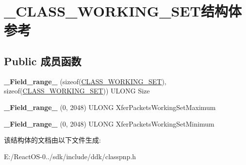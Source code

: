 \hypertarget{struct___c_l_a_s_s___w_o_r_k_i_n_g___s_e_t}{}\section{\+\_\+\+C\+L\+A\+S\+S\+\_\+\+W\+O\+R\+K\+I\+N\+G\+\_\+\+S\+E\+T结构体 参考}
\label{struct___c_l_a_s_s___w_o_r_k_i_n_g___s_e_t}
\subsection*{Public 成员函数}
\begin{DoxyCompactItemize}
\item 
\mbox{\label{struct___c_l_a_s_s___w_o_r_k_i_n_g___s_e_t_a23b84d77333ad68f33f71a8c86b0ad37}} 
{\bfseries \+\_\+\+Field\+\_\+range\+\_\+} (sizeof(\hyperlink{struct___c_l_a_s_s___w_o_r_k_i_n_g___s_e_t}{C\+L\+A\+S\+S\+\_\+\+W\+O\+R\+K\+I\+N\+G\+\_\+\+S\+ET}), sizeof(\hyperlink{struct___c_l_a_s_s___w_o_r_k_i_n_g___s_e_t}{C\+L\+A\+S\+S\+\_\+\+W\+O\+R\+K\+I\+N\+G\+\_\+\+S\+ET})) U\+L\+O\+NG Size
\item 
\mbox{\label{struct___c_l_a_s_s___w_o_r_k_i_n_g___s_e_t_a58d1459af49ecf03b95abb2e3c62f640}} 
{\bfseries \+\_\+\+Field\+\_\+range\+\_\+} (0, 2048) U\+L\+O\+NG Xfer\+Packets\+Working\+Set\+Maximum
\item 
\mbox{\label{struct___c_l_a_s_s___w_o_r_k_i_n_g___s_e_t_a70ab0d249d8369d402a045745aa3901b}} 
{\bfseries \+\_\+\+Field\+\_\+range\+\_\+} (0, 2048) U\+L\+O\+NG Xfer\+Packets\+Working\+Set\+Minimum
\end{DoxyCompactItemize}


该结构体的文档由以下文件生成\+:\begin{DoxyCompactItemize}
\item 
E\+:/\+React\+O\+S-\/0../sdk/include/ddk/classpnp.\+h\end{DoxyCompactItemize}

